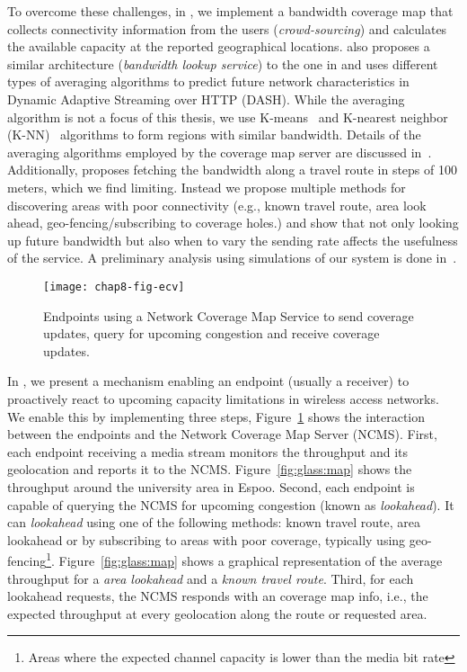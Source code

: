 To overcome these challenges, in , we implement a bandwidth
coverage map that collects connectivity information from the users (\emph
{crowd-sourcing}) and calculates the available capacity at the reported
geographical locations. \cite{6012045} also proposes a similar architecture
(\emph{bandwidth lookup service}) to the one in  and uses
different types of averaging algorithms to predict future network
characteristics in Dynamic Adaptive Streaming over HTTP (DASH). While the
averaging algorithm is not a focus of this thesis, we use
K-means~\cite{Kanungo:2002:LSA:513400.513402} and K-nearest neighbor
(K-NN)~\cite{Iwerks:2003:CKN:1315451.1315496} algorithms to form regions with
similar bandwidth. Details of the averaging algorithms employed by the
coverage map server are discussed in~\cite{sharmistha-thesis}. Additionally,
\cite{Riiser:2012:2240136} proposes fetching the bandwidth along a travel
route in steps of 100 meters, which we find limiting. Instead we propose
multiple methods for discovering areas with poor connectivity (e.g., known
travel route, area look ahead, geo-fencing/subscribing to coverage holes.) and
show that not only looking up future bandwidth but also when to vary the
sending rate affects the usefulness of the service. A preliminary analysis
using simulations of our system is done in~\cite{Curcio:glass}.

\begin{figure}
\texttt{[image: chap8-fig-ecv]}
  \caption{Endpoints using a Network Coverage Map Service to send coverage
  updates, query for upcoming congestion and receive coverage updates.}
\label{fig:cc:ecv}
\end{figure}


In , we present a mechanism enabling an endpoint (usually a
receiver) to proactively react to upcoming capacity limitations in wireless
access networks. We enable this by implementing three steps,
Figure~\ref{fig:cc:ecv} shows the interaction between the endpoints and the
Network Coverage Map Server (NCMS). First, each endpoint receiving a media
stream monitors the throughput and its geolocation and reports it to the NCMS.
Figure~\ref{fig:glass:map} shows the throughput around the university area in
Espoo. Second, each endpoint is capable of querying the NCMS for upcoming
congestion (known as \emph{lookahead}). It can \emph{lookahead} using one of
the following methods: known travel route, area lookahead or by subscribing to
areas with poor coverage, typically using geo-fencing\footnote{Areas where the
expected channel capacity is lower than the media bit rate}.
Figure~\ref{fig:glass:map} shows a graphical representation of the average
throughput for a \emph{area lookahead} and a \emph{known travel route}. Third,
for each lookahead requests, the NCMS responds with an coverage map info,
i.e., the expected throughput at every geolocation along the route or
requested area.


